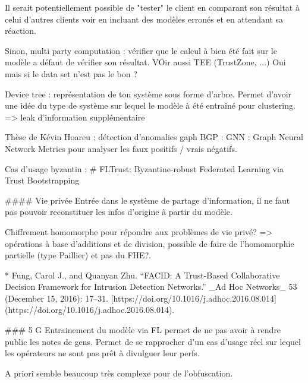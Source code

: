 \documentclass{article}
\begin{document}
\begin{markdown}
Il serait potentiellement possible de "tester" le client en comparant son résultat à celui d'autres clients voir en incluant des modèles erronés et en attendant sa réaction.

Sinon, multi party computation : vérifier que le calcul à bien été fait sur le modèle a défaut de vérifier son résultat. VOir aussi TEE (TrustZone, ...)
Oui mais si le data set n'est pas le bon ?

Device tree : représentation de ton système sous forme d'arbre. Permet d'avoir une idée du type de système sur lequel le modèle à été entraîné pour clustering. => leak d'information supplémentaire

Thèse de Kévin Hoareu : détection d'anomalies gaph BGP : 
GNN : Graph Neural Network 
Metrics pour analyser les faux positifs / vrais négatifs. 


Cas d'usage byzantin : # FLTrust: Byzantine-robust Federated Learning via Trust Bootstrapping


#### Vie privée 
Entrée dans le système de partage d'information, il ne faut pas pouvoir reconstituer les infos d'origine à partir du modèle. 

Chiffrement homomorphe pour répondre aux problèmes de vie privé? => opérations à base d'additions et de division, possible de faire de l'homomorphie partielle (type Paillier) et pas du FHE?.

* Fung, Carol J., and Quanyan Zhu. “FACID: A Trust-Based Collaborative Decision Framework for Intrusion Detection Networks.” _Ad Hoc Networks_ 53 (December 15, 2016): 17–31. [https://doi.org/10.1016/j.adhoc.2016.08.014](https://doi.org/10.1016/j.adhoc.2016.08.014).


### 5 G 
Entrainement du modèle via FL permet de ne pas avoir à rendre public les notes de gens. Permet de se rapprocher d'un cas d'usage réel sur lequel les opérateurs ne sont pas prêt à divulguer leur perfs. 

A priori semble beaucoup très complexe pour de l'obfuscation.  


\end{markdown}
\end{document}

